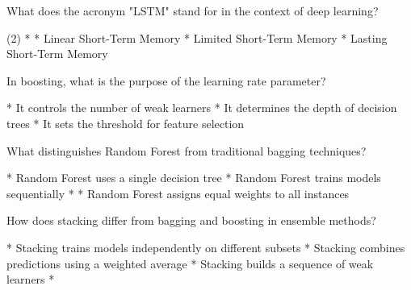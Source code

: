 \documentclass[10pt]{extarticle}
\begin{document}
\begin{exercise}
    What does the acronym "LSTM" stand for in the context of deep learning?
    \begin{choice}(2)
        * 
        * Linear Short-Term Memory
        * Limited Short-Term Memory
        * Lasting Short-Term Memory
    \end{choice}
\end{exercise}
\begin{solution}
\end{solution}

\begin{exercise}
    In boosting, what is the purpose of the learning rate parameter?
    \begin{choice}
        * It controls the number of weak learners
        * It determines the depth of decision trees
        * It sets the threshold for feature selection
    \end{choice}
\end{exercise}
\begin{solution}
\end{solution}

\begin{exercise}
    What distinguishes Random Forest from traditional bagging techniques?
    \begin{choice}
        * Random Forest uses a single decision tree
        * Random Forest trains models sequentially
        * 
        * Random Forest assigns equal weights to all instances
    \end{choice}
\end{exercise}
\begin{solution}
\end{solution}

\begin{exercise}
    How does stacking differ from bagging and boosting in ensemble methods?
    \begin{choice}
        * Stacking trains models independently on different subsets
        * Stacking combines predictions using a weighted average
        * Stacking builds a sequence of weak learners
        * 
    \end{choice}
\end{exercise}
\begin{solution}
\end{solution}
\end{document}
